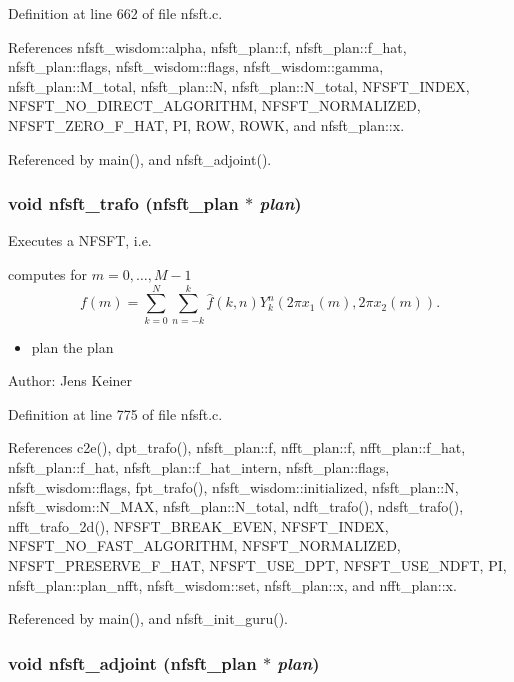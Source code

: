 Definition at line 662 of file nfsft.c.

References nfsft\_\-wisdom::alpha, nfsft\_\-plan::f, nfsft\_\-plan::f\_\-hat, nfsft\_\-plan::flags, nfsft\_\-wisdom::flags, nfsft\_\-wisdom::gamma, nfsft\_\-plan::M\_\-total, nfsft\_\-plan::N, nfsft\_\-plan::N\_\-total, NFSFT\_\-INDEX, NFSFT\_\-NO\_\-DIRECT\_\-ALGORITHM, NFSFT\_\-NORMALIZED, NFSFT\_\-ZERO\_\-F\_\-HAT, PI, ROW, ROWK, and nfsft\_\-plan::x.

Referenced by main(), and nfsft\_\-adjoint().\hypertarget{group__nfsft_g5796fc68c432d46dfcab7abd8c56ee22}{
\subsubsection{\setlength{\rightskip}{0pt plus 5cm}void nfsft\_\-trafo ({\bf nfsft\_\-plan} $\ast$ {\em plan})}}
\label{group__nfsft_g5796fc68c432d46dfcab7abd8c56ee22}


Executes a NFSFT, i.e. 

computes for $m = 0,\ldots,M-1$ \[ f(m) = \sum_{k=0}^N \sum_{n=-k}^k \hat{f}(k,n) Y_k^n\left(2\pi x_1(m), 2\pi x_2(m)\right). \]

\begin{itemize}
\item plan the plan\end{itemize}
\begin{Desc}
\item[Author:]Jens Keiner \end{Desc}


Definition at line 775 of file nfsft.c.

References c2e(), dpt\_\-trafo(), nfsft\_\-plan::f, nfft\_\-plan::f, nfft\_\-plan::f\_\-hat, nfsft\_\-plan::f\_\-hat, nfsft\_\-plan::f\_\-hat\_\-intern, nfsft\_\-plan::flags, nfsft\_\-wisdom::flags, fpt\_\-trafo(), nfsft\_\-wisdom::initialized, nfsft\_\-plan::N, nfsft\_\-wisdom::N\_\-MAX, nfsft\_\-plan::N\_\-total, ndft\_\-trafo(), ndsft\_\-trafo(), nfft\_\-trafo\_\-2d(), NFSFT\_\-BREAK\_\-EVEN, NFSFT\_\-INDEX, NFSFT\_\-NO\_\-FAST\_\-ALGORITHM, NFSFT\_\-NORMALIZED, NFSFT\_\-PRESERVE\_\-F\_\-HAT, NFSFT\_\-USE\_\-DPT, NFSFT\_\-USE\_\-NDFT, PI, nfsft\_\-plan::plan\_\-nfft, nfsft\_\-wisdom::set, nfsft\_\-plan::x, and nfft\_\-plan::x.

Referenced by main(), and nfsft\_\-init\_\-guru().\hypertarget{group__nfsft_g813bb48d404c7286310733c99a81a169}{
\subsubsection{\setlength{\rightskip}{0pt plus 5cm}void nfsft\_\-adjoint ({\bf nfsft\_\-plan} $\ast$ {\em plan})}}
\label{group__nfsft_g813bb48d404c7286310733c99a81a169}


